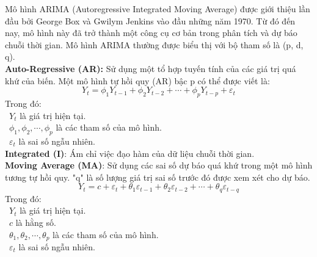 Mô hình ARIMA (Autoregressive Integrated Moving Average) được giới thiệu lần đầu bởi George Box và Gwilym Jenkins vào đầu những năm 1970. Từ đó đến nay, mô hình này đã trở thành một công cụ cơ bản trong phân tích và dự báo chuỗi thời gian. Mô hình ARIMA thường được biểu thị với bộ tham số là (p, d, q).\\
\textbf{Auto-Regressive (AR):} Sử dụng một tổ hợp tuyến tính của các giá trị quá khứ của biến. Một mô hình tự hồi quy (AR) bậc p có thể được viết là:
\[
Y_{t}=\phi_{1}Y_{t-1}+\phi_{2}Y_{t-2}+\cdots+\phi_{p}Y_{t-p}+\varepsilon_{t}
\]
Trong đó:\\
    \indent\textbullet\ \(Y_{t}\) là giá trị hiện tại.\\
    \indent\textbullet\ \(\phi_{1},\phi_{2},\cdots,\phi_{p}\) là các tham số của mô hình.\\
    \indent\textbullet\ \(\varepsilon_{t}\) là sai số ngẫu nhiên.\\
\textbf{Integrated (I)}: Ám chỉ việc đạo hàm của dữ liệu chuỗi thời gian.\\
\textbf{Moving Average (MA)}: Sử dụng các sai số dự báo quá khứ trong một mô hình tương tự hồi quy. "q" là số lượng giá trị sai số trước đó được xem xét cho dự báo.
\[
Y_{t}=c+\varepsilon_{t}+\theta_{1}\varepsilon_{t-1}+\theta_{2}\varepsilon_{t-2}+ \cdots+ \theta_{q}\varepsilon_{t-q}
\]
Trong đó:\\
    \indent\textbullet\ \(Y_{t}\) là giá trị hiện tại.\\
    \indent\textbullet\ \(c\) là hằng số.\\
    \indent\textbullet\ \(\theta_{1},\theta_{2},\cdots,\theta_{p}\) là các tham số của mô hình.\\
    \indent\textbullet\ \(\varepsilon_{t}\) là sai số ngẫu nhiên.
